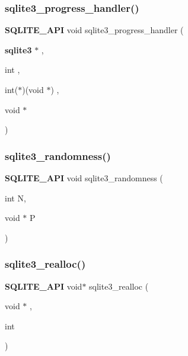 \mbox{\label{sqlite3_8h_a77ee51dd7f972d2238c12a4da0bfc552}} 
\subsubsection{sqlite3\_progress\_handler()}
{\footnotesize\ttfamily \textbf{ S\+Q\+L\+I\+T\+E\+\_\+\+A\+PI} void sqlite3\+\_\+progress\+\_\+handler (\begin{DoxyParamCaption}\item[{\textbf{ sqlite3} $\ast$}]{,  }\item[{int}]{,  }\item[{int($\ast$)(void $\ast$)}]{,  }\item[{void $\ast$}]{ }\end{DoxyParamCaption})}

\mbox{\label{sqlite3_8h_aa452ad88657d4606e137b09c4e9315c7}} 
\subsubsection{sqlite3\_randomness()}
{\footnotesize\ttfamily \textbf{ S\+Q\+L\+I\+T\+E\+\_\+\+A\+PI} void sqlite3\+\_\+randomness (\begin{DoxyParamCaption}\item[{int}]{N,  }\item[{void $\ast$}]{P }\end{DoxyParamCaption})}

\mbox{\label{sqlite3_8h_a627f0eeface58024ef47403d8cc76b35}} 
\subsubsection{sqlite3\_realloc()}
{\footnotesize\ttfamily \textbf{ S\+Q\+L\+I\+T\+E\+\_\+\+A\+PI} void$\ast$ sqlite3\+\_\+realloc (\begin{DoxyParamCaption}\item[{void $\ast$}]{,  }\item[{int}]{ }\end{DoxyParamCaption})}

\mbox{\label{sqlite3_8h_afe88c85e9f864a3fd92941cad197245d}} 
